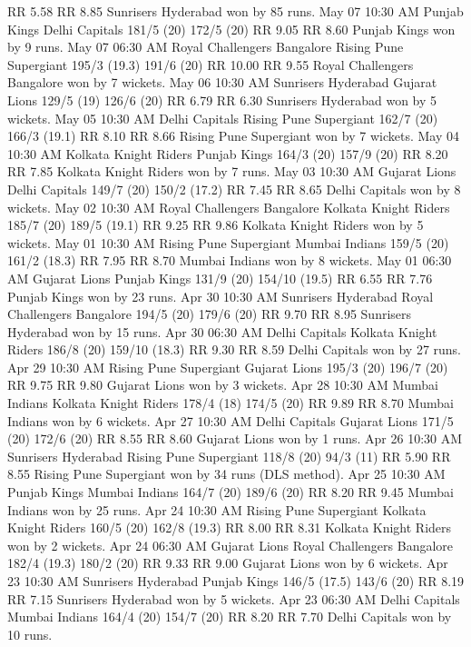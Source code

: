 RR 5.58
RR 8.85
Sunrisers Hyderabad won by 85 runs.
May 07
10:30 AM
Punjab Kings
Delhi Capitals
181/5 (20)
172/5 (20)
RR 9.05
RR 8.60
Punjab Kings won by 9 runs.
May 07
06:30 AM
Royal Challengers Bangalore
Rising Pune Supergiant
195/3 (19.3)
191/6 (20)
RR 10.00
RR 9.55
Royal Challengers Bangalore won by 7 wickets.
May 06
10:30 AM
Sunrisers Hyderabad
Gujarat Lions
129/5 (19)
126/6 (20)
RR 6.79
RR 6.30
Sunrisers Hyderabad won by 5 wickets.
May 05
10:30 AM
Delhi Capitals
Rising Pune Supergiant
162/7 (20)
166/3 (19.1)
RR 8.10
RR 8.66
Rising Pune Supergiant won by 7 wickets.
May 04
10:30 AM
Kolkata Knight Riders
Punjab Kings
164/3 (20)
157/9 (20)
RR 8.20
RR 7.85
Kolkata Knight Riders won by 7 runs.
May 03
10:30 AM
Gujarat Lions
Delhi Capitals
149/7 (20)
150/2 (17.2)
RR 7.45
RR 8.65
Delhi Capitals won by 8 wickets.
May 02
10:30 AM
Royal Challengers Bangalore
Kolkata Knight Riders
185/7 (20)
189/5 (19.1)
RR 9.25
RR 9.86
Kolkata Knight Riders won by 5 wickets.
May 01
10:30 AM
Rising Pune Supergiant
Mumbai Indians
159/5 (20)
161/2 (18.3)
RR 7.95
RR 8.70
Mumbai Indians won by 8 wickets.
May 01
06:30 AM
Gujarat Lions
Punjab Kings
131/9 (20)
154/10 (19.5)
RR 6.55
RR 7.76
Punjab Kings won by 23 runs.
Apr 30
10:30 AM
Sunrisers Hyderabad
Royal Challengers Bangalore
194/5 (20)
179/6 (20)
RR 9.70
RR 8.95
Sunrisers Hyderabad won by 15 runs.
Apr 30
06:30 AM
Delhi Capitals
Kolkata Knight Riders
186/8 (20)
159/10 (18.3)
RR 9.30
RR 8.59
Delhi Capitals won by 27 runs.
Apr 29
10:30 AM
Rising Pune Supergiant
Gujarat Lions
195/3 (20)
196/7 (20)
RR 9.75
RR 9.80
Gujarat Lions won by 3 wickets.
Apr 28
10:30 AM
Mumbai Indians
Kolkata Knight Riders
178/4 (18)
174/5 (20)
RR 9.89
RR 8.70
Mumbai Indians won by 6 wickets.
Apr 27
10:30 AM
Delhi Capitals
Gujarat Lions
171/5 (20)
172/6 (20)
RR 8.55
RR 8.60
Gujarat Lions won by 1 runs.
Apr 26
10:30 AM
Sunrisers Hyderabad
Rising Pune Supergiant
118/8 (20)
94/3 (11)
RR 5.90
RR 8.55
Rising Pune Supergiant won by 34 runs (DLS method).
Apr 25
10:30 AM
Punjab Kings
Mumbai Indians
164/7 (20)
189/6 (20)
RR 8.20
RR 9.45
Mumbai Indians won by 25 runs.
Apr 24
10:30 AM
Rising Pune Supergiant
Kolkata Knight Riders
160/5 (20)
162/8 (19.3)
RR 8.00
RR 8.31
Kolkata Knight Riders won by 2 wickets.
Apr 24
06:30 AM
Gujarat Lions
Royal Challengers Bangalore
182/4 (19.3)
180/2 (20)
RR 9.33
RR 9.00
Gujarat Lions won by 6 wickets.
Apr 23
10:30 AM
Sunrisers Hyderabad
Punjab Kings
146/5 (17.5)
143/6 (20)
RR 8.19
RR 7.15
Sunrisers Hyderabad won by 5 wickets.
Apr 23
06:30 AM
Delhi Capitals
Mumbai Indians
164/4 (20)
154/7 (20)
RR 8.20
RR 7.70
Delhi Capitals won by 10 runs.

